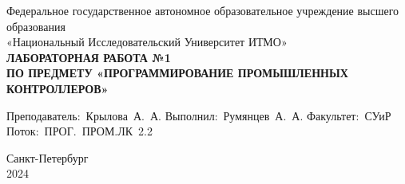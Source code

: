 \documentclass[a4paper, 16pt]{article}
\begin{document}
    \begin{titlepage}
        \begin{center}
        \vfill
        
        Федеральное государственное автономное образовательное учреждение высшего образования\\
        «Национальный Исследовательский Университет ИТМО»\ \\
        
        \vfill
        {\large\bf ЛАБОРАТОРНАЯ РАБОТА №1\\
            ПО ПРЕДМЕТУ «ПРОГРАММИРОВАНИЕ ПРОМЫШЛЕННЫХ КОНТРОЛЛЕРОВ»}
        \vfill
            
        \begin{flushright}
            \begin{minipage}{.45\textwidth}
            {
                \hbox{Преподаватель: Крылова А. А.}
                \hbox{Выполнил: Румянцев А. А.}
                \hbox{}
                \hbox{Факультет: СУиР}
                \hbox{Поток: ПРОГ. ПРОМ.ЛК 2.2}
            }
            \end{minipage}
        \end{flushright}
        
        \vfill
                
        Санкт-Петербург\\
        2024
        \end{center}
    \end{titlepage}
    \setlength{\parskip}{1.5mm}
    
    \tableofcontents

    \newpage
\end{document}
